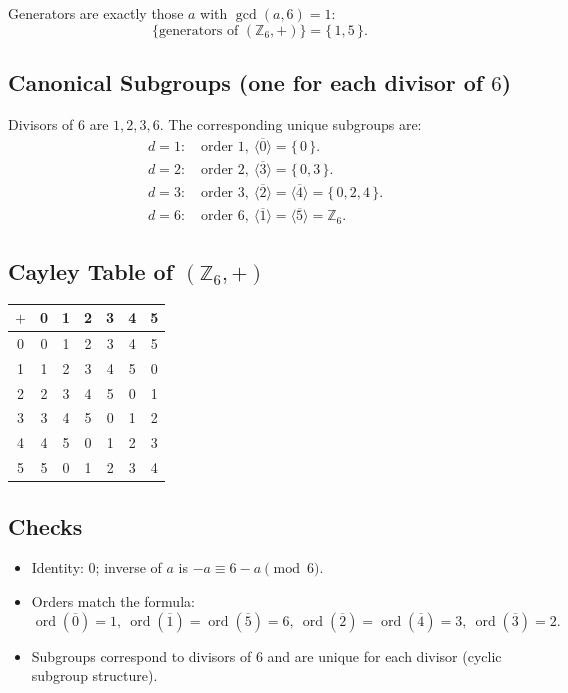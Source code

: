 \documentclass[12pt]{article}
\begin{document}
	Generators are exactly those $a$ with $\gcd(a,6)=1$:
	$$
	\{\text{generators of }(\mathbb{Z}_6,+)\}=\{\,1,5\,\}.
	$$
	
	\subsection*{Canonical Subgroups (one for each divisor of $6$)}
	Divisors of $6$ are $1,2,3,6$. The corresponding unique subgroups are:
	\begin{align*}
		&d=1:\quad \text{order }1,\ \langle \overline{0}\rangle=\{\,0\,\}.\\[4pt]
		&d=2:\quad \text{order }2,\ \langle \overline{3}\rangle=\{\,0,3\,\}.\\[4pt]
		&d=3:\quad \text{order }3,\ \langle \overline{2}\rangle=\langle \overline{4}\rangle=\{\,0,2,4\,\}.\\[4pt]
		&d=6:\quad \text{order }6,\ \langle \overline{1}\rangle=\langle \overline{5}\rangle=\mathbb{Z}_6.
	\end{align*}
	
	\subsection*{Cayley Table of $(\mathbb{Z}_6,+)$}
	\begin{center}
		\begin{tabular}{c|cccccc}
			$+$ & 0 & 1 & 2 & 3 & 4 & 5 \\ \hline
			0 & 0 & 1 & 2 & 3 & 4 & 5 \\
			1 & 1 & 2 & 3 & 4 & 5 & 0 \\
			2 & 2 & 3 & 4 & 5 & 0 & 1 \\
			3 & 3 & 4 & 5 & 0 & 1 & 2 \\
			4 & 4 & 5 & 0 & 1 & 2 & 3 \\
			5 & 5 & 0 & 1 & 2 & 3 & 4 \\
		\end{tabular}
	\end{center}
	
	\subsection*{Checks}
	\begin{itemize}
		\item Identity: $0$; inverse of $a$ is $-a\equiv 6-a\pmod{6}$.
		\item Orders match the formula:
		$$
		\operatorname{ord}(\overline{0})=1,\ 
		\operatorname{ord}(\overline{1})=\operatorname{ord}(\overline{5})=6,\ 
		\operatorname{ord}(\overline{2})=\operatorname{ord}(\overline{4})=3,\ 
		\operatorname{ord}(\overline{3})=2.
		$$
		\item Subgroups correspond to divisors of $6$ and are unique for each divisor (cyclic subgroup structure).
	\end{itemize}
	
	
\end{document}
